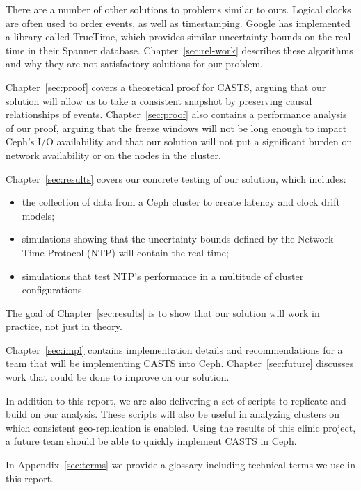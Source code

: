 There are a number of other solutions to problems similar to
ours. Logical clocks are often used to order events, as well as
timestamping. Google has implemented a library called TrueTime, which
provides similar uncertainty bounds on the real time in their Spanner
database. Chapter~\ref{sec:rel-work} describes these algorithms and
why they are not satisfactory solutions for our problem.

Chapter~\ref{sec:proof} covers a theoretical proof for CASTS,
arguing that our solution will allow us to take a consistent snapshot
by preserving causal relationships of events. Chapter~\ref{sec:proof} also
contains a performance analysis of our proof, arguing that the freeze
windows will not be long enough to impact Ceph's I/O availability and that our
solution will not put a significant burden on network availability or
on the nodes in the cluster.

Chapter~\ref{sec:results} covers our concrete testing of our solution,
which includes:

\begin{itemize}
\item the collection of data from a Ceph cluster to create
  latency and clock drift models;
\item simulations showing that the uncertainty bounds defined by the
  Network Time Protocol (NTP) will contain the real time;
\item simulations that test NTP's performance in a multitude of
  cluster configurations.
\end{itemize}
The goal of Chapter~\ref{sec:results} is to show that our solution will work
in practice, not just in theory.

Chapter~\ref{sec:impl} contains implementation details and
recommendations for a team that will be implementing CASTS
into Ceph. Chapter~\ref{sec:future} discusses work that could be done
to improve on our solution.

In addition to this report, we are also delivering a set of scripts to
replicate and build on our analysis. These scripts will also be useful
in analyzing clusters on which consistent geo-replication is
enabled. Using the results of this clinic project, a future team
should be able to quickly implement CASTS in Ceph.

In Appendix~\ref{sec:terms} we provide
a glossary including technical terms we use in this report.
